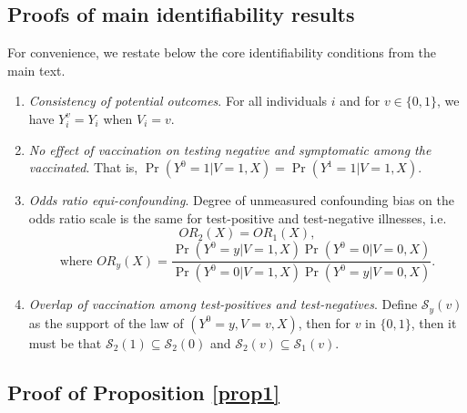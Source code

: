 \begin{appendix}
\begin{refsection}
    \section{Proofs of main identifiability results} \label{sec:proofs}
    For convenience, we restate below the core identifiability conditions from the main text. 
    \begin{enumerate}[label=\upshape(A\arabic*), ref=A\arabic*]
    \item\label{app_ass1} \textit{Consistency of potential outcomes}. For all individuals $i$ and for $v \in \{0, 1\}$, we have $Y_i^v = Y_i$ when $V_i = v$. 
    \item\label{app_ass2} \textit{No effect of vaccination on testing negative and symptomatic among the vaccinated}. That is, $\Pr(Y^0=1 | V = 1, X) = \Pr(Y^1=1 | V = 1, X).$
    \item\label{app_ass3} \textit{Odds ratio equi-confounding}. Degree of unmeasured confounding bias on the odds ratio scale is the same for test-positive and test-negative illnesses, i.e. 
    $$OR_2(X) = OR_1(X), $$
    $$ \text{where } OR_y(X) = \frac{\Pr(Y^0 = y | V = 1, X)\Pr(Y^0 = 0 | V = 0, X)}{\Pr(Y^0 = 0 | V = 1, X)\Pr(Y^0 = y | V = 0, X)}.$$
    \item\label{app_ass4} \textit{Overlap of vaccination among test-positives and test-negatives}. Define $\mathcal{S}_y(v)$ as the support of the law of $(Y^0 = y, V = v, X)$, then for $v$ in $\{0,1\}$, then it must be that $\mathcal{S}_2(1) \subseteq \mathcal{S}_2(0)$ and $\mathcal{S}_2(v) \subseteq \mathcal{S}_1(v).$
    \end{enumerate}

    
    \newpage
    \subsection{Proof of Proposition \ref{prop1}} \label{sec:proof1}
    

\end{refsection}
\end{appendix}
